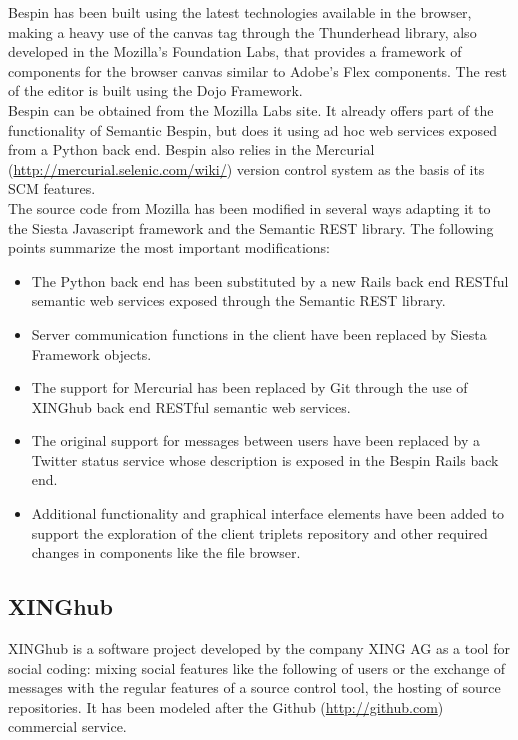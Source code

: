Bespin has been built using the latest technologies available in the browser, making a heavy use of the canvas tag through the
Thunderhead library, also developed in the Mozilla's Foundation Labs, that provides a framework of components for
the browser canvas similar to Adobe's Flex components. The rest of the editor is built using the Dojo Framework.\\

Bespin can be obtained from the Mozilla Labs site. It already offers part of the functionality of Semantic Bespin, but
does it using ad hoc web services exposed from a Python back end. Bespin also relies in the Mercurial (\url{http://mercurial.selenic.com/wiki/}) version control
system as the basis of its SCM features.\\

The source code from Mozilla has been modified in several ways adapting it to the Siesta Javascript framework and
the Semantic REST library. The following points summarize the most important modifications:

\begin{itemize}
\item The Python back end has been substituted by a new Rails back end RESTful semantic web services exposed through
  the Semantic REST library.
\item Server communication functions in the client have been replaced by Siesta Framework objects.
\item The support for Mercurial has been replaced by Git through the use of XINGhub back end RESTful semantic web services.
\item The original support for messages between users have been replaced by a Twitter status service whose description
  is exposed in the Bespin Rails back end.
\item Additional functionality and graphical interface elements have been added to support the exploration of the client
  triplets repository and other required changes in components like the file browser.
\end{itemize}

\subsection{XINGhub}

XINGhub is a software project developed by the company XING AG as a tool for social coding: mixing social features like
the following of users or the exchange of messages with the regular features of a source control tool, the hosting of
source repositories. It has been modeled after the Github (\url{http://github.com}) commercial service.\\

